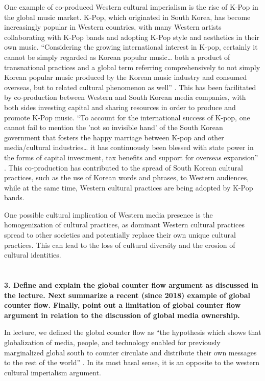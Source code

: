 \documentclass[a4paper]{article}
\begin{document}
        One example of co-produced Western cultural imperialism is the rise of K-Pop in the global music market. K-Pop, which originated
        in South Korea, has become increasingly popular in Western countries, with many Western artists collaborating with K-Pop bands and
        adopting K-Pop style and aesthetics in their own music. “Considering the growing international interest in K-pop, certainly it
        cannot be simply regarded as Korean popular music… both a product of transnational practices and a global term referring comprehensively
        to not simply Korean popular music produced by the Korean music industry and consumed overseas, but to related cultural phenomenon
        as well” \citep{phuong_2016}. This has been facilitated by co-production between Western and South Korean media companies, with both
        sides investing capital and sharing resources in order to produce and promote K-Pop music. “To account for the international success
        of K-pop, one cannot fail to mention the 'not so invisible hand' of the South Korean government that fosters the happy marriage between
        K-pop and other media/cultural industries… it has continuously been blessed with state power in the forms of capital investment, tax
        benefits and support for overseas expansion” \citep{phuong_2016}. This co-production has contributed to the spread of South Korean 
        cultural practices, such as the use of Korean words and phrases, to Western audiences, while at the same time, 
        Western cultural practices are being adopted by K-Pop bands. 
        
        One possible cultural implication of Western media presence is the homogenization of cultural practices, as 
        dominant Western cultural practices spread to other societies and potentially replace their own unique cultural practices. 
        This can lead to the loss of cultural diversity and the erosion of cultural identities.


    \section{}
        \textbf{3. Define and explain the global counter flow argument as discussed in the lecture. Next summarize a recent (since 2018) example of global counter flow. Finally, point out a limitation of global counter flow argument in relation to the discussion of global media ownership.}
        
        In lecture, we defined the global counter flow as “the hypothesis which shows that globalization of media, people, and technology enabled for previously 
        marginalized global south to counter circulate and distribute their own messages to the rest of the world” \citep{lesson10}. In its most basal sense, 
        it is an opposite to the western cultural imperialism argument. 
        
\end{document}
